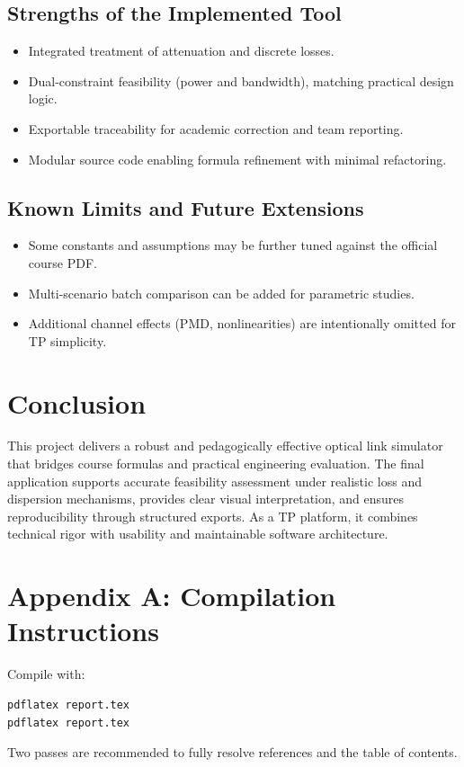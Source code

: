 \documentclass[11pt,a4paper]{article}
\begin{document}
\subsection{Strengths of the Implemented Tool}
\begin{itemize}[leftmargin=1.2cm]
  \item Integrated treatment of attenuation and discrete losses.
  \item Dual-constraint feasibility (power and bandwidth), matching practical design logic.
  \item Exportable traceability for academic correction and team reporting.
  \item Modular source code enabling formula refinement with minimal refactoring.
\end{itemize}

\subsection{Known Limits and Future Extensions}
\begin{itemize}[leftmargin=1.2cm]
  \item Some constants and assumptions may be further tuned against the official course PDF.
  \item Multi-scenario batch comparison can be added for parametric studies.
  \item Additional channel effects (PMD, nonlinearities) are intentionally omitted for TP simplicity.
\end{itemize}

\section{Conclusion}
This project delivers a robust and pedagogically effective optical link simulator that bridges course formulas and practical engineering evaluation. The final application supports accurate feasibility assessment under realistic loss and dispersion mechanisms, provides clear visual interpretation, and ensures reproducibility through structured exports. As a TP platform, it combines technical rigor with usability and maintainable software architecture.

\section*{Appendix A: Compilation Instructions}
Compile with:
\begin{verbatim}
pdflatex report.tex
pdflatex report.tex
\end{verbatim}
Two passes are recommended to fully resolve references and the table of contents.
\end{document}
